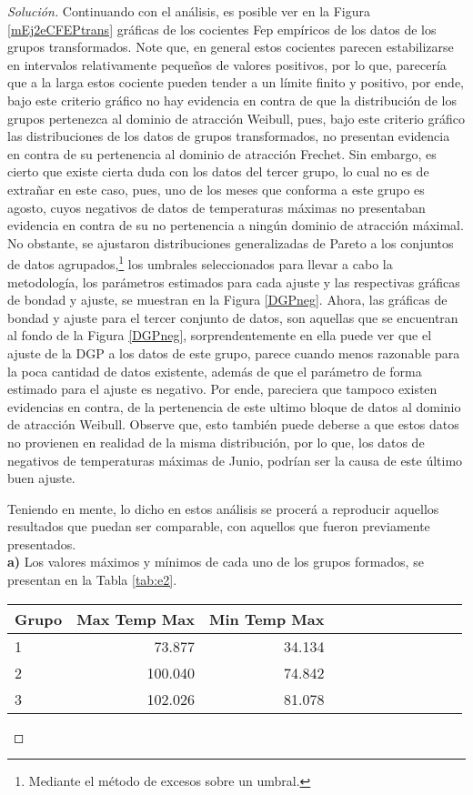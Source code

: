 \documentclass[10.5pt,notitlepage]{article}
\newenvironment{solucion}
  {\begin{proof}[Solución]}
  {\end{proof}}
\theoremstyle{plain}
\begin{document}
\begin{solucion}
Continuando con el análisis, es posible ver en la Figura \ref{mEj2eCFEPtrans} gráficas de los cocientes Fep empíricos de los datos de los grupos transformados. Note que, en general estos cocientes parecen estabilizarse en intervalos relativamente pequeños de valores positivos, por lo que, parecería que a la larga estos cociente pueden tender a un límite finito y positivo, por ende, bajo este criterio gráfico no hay evidencia en contra de que la distribución de los grupos pertenezca al dominio de atracción Weibull, pues, bajo este criterio gráfico las distribuciones de los datos de grupos transformados, no presentan evidencia en contra de su pertenencia al dominio de atracción Frechet. Sin embargo, es cierto que existe cierta duda con los datos del tercer grupo, lo cual no es de extrañar en este caso, pues, uno de los meses que conforma a este grupo es agosto, cuyos negativos de datos de temperaturas máximas no presentaban evidencia en contra de su no pertenencia a ningún dominio de atracción máximal. No obstante, se ajustaron distribuciones generalizadas de Pareto a los conjuntos de datos agrupados,\footnote{Mediante el método de excesos sobre un umbral.} los umbrales seleccionados para llevar a cabo la metodología, los parámetros estimados para cada ajuste y las respectivas gráficas de bondad y ajuste, se muestran en la Figura \ref{DGPneg}. Ahora, las gráficas de bondad y ajuste para el tercer conjunto de datos, son aquellas que se encuentran al fondo de la Figura \ref{DGPneg}, sorprendentemente en ella puede ver que el ajuste de la DGP a los datos de este grupo, parece cuando menos razonable para la poca cantidad de datos existente, además de que el parámetro de forma estimado para el ajuste es negativo. Por ende, pareciera que tampoco existen evidencias en contra, de la pertenencia de este ultimo bloque de datos al dominio de atracción Weibull. Observe que, esto también puede deberse a que estos datos no provienen en realidad de la misma distribución, por lo que, los datos de negativos de temperaturas máximas de Junio, podrían ser la causa de este último buen ajuste.

Teniendo en mente, lo dicho en estos análisis se procerá a reproducir aquellos resultados que puedan ser comparable, con aquellos que fueron previamente presentados. \\

\textbf{a)}
Los valores máximos y mínimos de cada uno de los grupos formados, se presentan en la Tabla \ref{tab:e2}.
\begin{table}[H]
        \centering
        \begin{tabular}{@{}l@{\hskip 0.3in}r@{\hskip 0.3in}r@{\hskip 0.3in}r@{\hskip 0.3in}r@{\hskip 0.3in}r@{\hskip 0.3in}r@{\hskip 0.3in}r@{\hskip 0.3in}r@{\hskip 0.3in}r@{\hskip 0.3in}r@{\hskip 0.3in}r@{}}
        \toprule
     Grupo & Max Temp Max & Min Temp Max\\
        \midrule         
   1&73.877&34.134  \\            
   2&100.040&74.842\\
   3&102.026& 81.078\\ 


\end{tabular}
\end{table}
\end{solucion}
\end{document}
